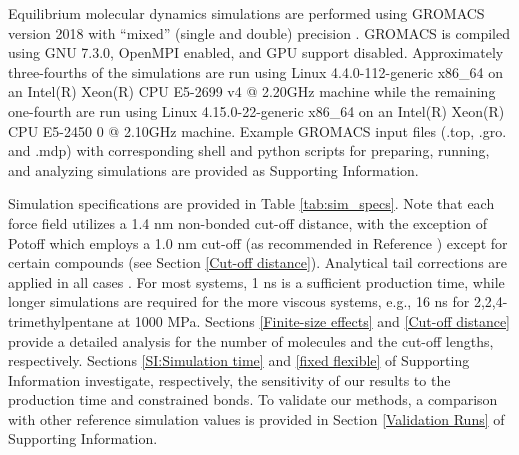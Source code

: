\documentclass[preprint,review,12pt]{elsarticle}
\begin{document}
	
	Equilibrium molecular dynamics simulations are performed using GROMACS version 2018 with ``mixed'' (single and double) precision \cite{GROMACS_2018}. GROMACS is compiled using GNU 7.3.0, OpenMPI enabled, and GPU support disabled. Approximately three-fourths of the simulations are run using Linux 4.4.0-112-generic x86\_64 on an Intel(R) Xeon(R) CPU E5-2699 v4 @ 2.20GHz machine while the remaining one-fourth are run using Linux 4.15.0-22-generic x86\_64 on an Intel(R) Xeon(R) CPU E5-2450 0 @ 2.10GHz machine. Example GROMACS input files (.top, .gro. and .mdp) with corresponding shell and python scripts for preparing, running, and analyzing simulations are provided as Supporting Information. 
	
	
	Simulation specifications are provided in Table \ref{tab:sim_specs}. Note that each force field utilizes a 1.4 nm non-bonded cut-off distance, with the exception of Potoff which employs a 1.0 nm cut-off (as recommended in Reference ) except for certain compounds (see Section \ref{Cut-off distance}). Analytical tail corrections are applied in all cases \cite{GROMACS_note}. For most systems, 1 ns is a sufficient production time, while longer simulations are required for the more viscous systems, e.g., 16 ns for 2,2,4-trimethylpentane at 1000 MPa. Sections \ref{Finite-size effects} and \ref{Cut-off distance} provide a detailed analysis for the number of molecules and the cut-off lengths, respectively. Sections \ref{SI:Simulation time} and \ref{fixed flexible} of Supporting Information investigate, respectively, the sensitivity of our results to the production time and constrained bonds. To validate our methods, a comparison with other reference simulation values \cite{NIST_SRSW,Kioupis2000,Nieto2006} is provided in Section \ref{Validation Runs} of Supporting Information. 
\end{document}

